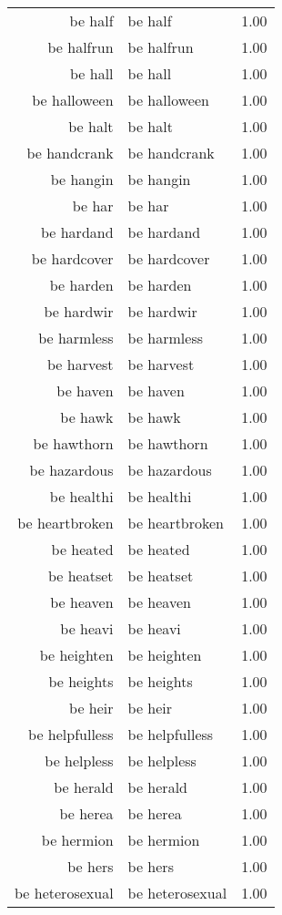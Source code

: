 \begin{table}[ht]
\begin{tabular}{rlr}
  be half & be half & 1.00 \\ 
  be halfrun & be halfrun & 1.00 \\ 
  be hall & be hall & 1.00 \\ 
  be halloween & be halloween & 1.00 \\ 
  be halt & be halt & 1.00 \\ 
  be handcrank & be handcrank & 1.00 \\ 
  be hangin & be hangin & 1.00 \\ 
  be har & be har & 1.00 \\ 
  be hardand & be hardand & 1.00 \\ 
  be hardcover & be hardcover & 1.00 \\ 
  be harden & be harden & 1.00 \\ 
  be hardwir & be hardwir & 1.00 \\ 
  be harmless & be harmless & 1.00 \\ 
  be harvest & be harvest & 1.00 \\ 
  be haven & be haven & 1.00 \\ 
  be hawk & be hawk & 1.00 \\ 
  be hawthorn & be hawthorn & 1.00 \\ 
  be hazardous & be hazardous & 1.00 \\ 
  be healthi & be healthi & 1.00 \\ 
  be heartbroken & be heartbroken & 1.00 \\ 
  be heated & be heated & 1.00 \\ 
  be heatset & be heatset & 1.00 \\ 
  be heaven & be heaven & 1.00 \\ 
  be heavi & be heavi & 1.00 \\ 
  be heighten & be heighten & 1.00 \\ 
  be heights & be heights & 1.00 \\ 
  be heir & be heir & 1.00 \\ 
  be helpfulless & be helpfulless & 1.00 \\ 
  be helpless & be helpless & 1.00 \\ 
  be herald & be herald & 1.00 \\ 
  be herea & be herea & 1.00 \\ 
  be hermion & be hermion & 1.00 \\ 
  be hers & be hers & 1.00 \\ 
  be heterosexual & be heterosexual & 1.00 \\ 

\end{tabular}
\end{table}
